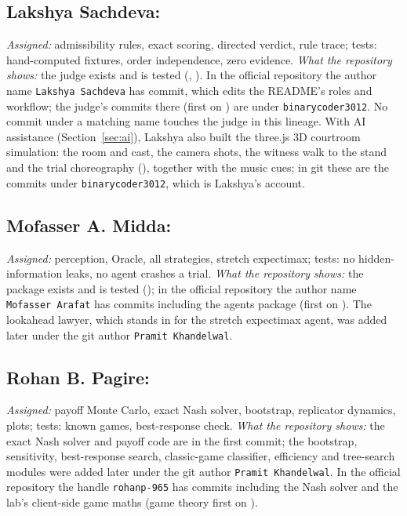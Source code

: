 \subsection*{Lakshya Sachdeva: }
\emph{Assigned:} admissibility rules, exact scoring, directed verdict, rule trace; tests: hand-computed fixtures, order independence, zero evidence. \emph{What the repository shows:} the judge exists and is tested (, ). In the official repository the author name \texttt{Lakshya Sachdeva} has \CourseLakshya{} commit, which edits the README's roles and workflow; the judge's commits there (first on \CourseFirstJudge{}) are under \texttt{binarycoder3012}. No commit under a matching name touches the judge in this lineage. With AI assistance (Section~\ref{sec:ai}), Lakshya also built the three.js 3D courtroom simulation: the room and cast, the camera shots, the witness walk to the stand and the trial choreography (), together with the music cues; in git these are the commits under \texttt{binarycoder3012}, which is Lakshya's account. 

\subsection*{Mofasser A. Midda: }
\emph{Assigned:} perception, Oracle, all strategies, stretch expectimax; tests: no hidden-information leaks, no agent crashes a trial. \emph{What the repository shows:} the package exists and is tested (); in the official repository the author name \texttt{Mofasser Arafat} has \CourseMofasser{} commits including the agents package (first on \CourseFirstAgents{}). The lookahead lawyer, which stands in for the stretch expectimax agent, was added later under the git author \texttt{Pramit Khandelwal}. 

\subsection*{Rohan B. Pagire: }
\emph{Assigned:} payoff Monte Carlo, exact Nash solver, bootstrap, replicator dynamics, plots; tests: known games, best-response check. \emph{What the repository shows:} the exact Nash solver and payoff code are in the first commit; the bootstrap, sensitivity, best-response search, classic-game classifier, efficiency and tree-search modules were added later under the git author \texttt{Pramit Khandelwal}. In the official repository the handle \texttt{rohanp-965} has \CourseRohan{} commits including the Nash solver and the lab's client-side game maths (game theory first on \CourseFirstGametheory{}). 

